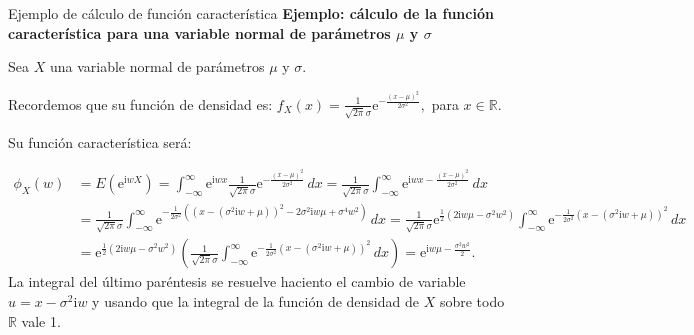 \documentclass[
  ignorenonframetext,
  aspectratio=169]{beamer}
\begin{document}
\begin{frame}{Ejemplo de cálculo de función característica}
\protect\hypertarget{ejemplo-de-cuxe1lculo-de-funciuxf3n-caracteruxedstica-2}{}
\textbf{Ejemplo: cálculo de la función característica para una variable
normal de parámetros \(\mu\) y \(\sigma\)}

Sea \(X\) una variable normal de parámetros \(\mu\) y \(\sigma\).

Recordemos que su función de densidad es:
\(f_X(x)=\frac{1}{\sqrt{2\pi}\sigma}\mathrm{e}^{-\frac{(x-\mu)^2}{2\sigma^2}},\)
para \(x\in \mathbb{R}\).

Su función característica será:

\[
\begin{array}{rl}
\phi_X (w) & =E\left(\mathrm{e}^{\mathrm{i}w X}\right)=\int_{-\infty}^\infty \mathrm{e}^{\mathrm{i}w x}\frac{1}{\sqrt{2\pi}\sigma}\mathrm{e}^{-\frac{(x-\mu)^2}{2\sigma^2}}\, dx = \frac{1}{\sqrt{2\pi}\sigma} \int_{-\infty}^\infty \mathrm{e}^{\mathrm{i}wx-\frac{(x-\mu)^2}{2\sigma^2}}\, dx \\  & =  \frac{1}{\sqrt{2\pi}\sigma} \int_{-\infty}^\infty \mathrm{e}^{-\frac{1}{2\sigma^2}\left((x-(\sigma^2 \mathrm{i}w+\mu))^2-2\sigma^2 \mathrm{i}w \mu+\sigma^4 w^2\right)}\, dx = \frac{1}{\sqrt{2\pi}\sigma} \mathrm{e}^{\frac{1}{2}(2 \mathrm{i}w \mu -\sigma^2 w^2)}\int_{-\infty}^\infty \mathrm{e}^{-\frac{1}{2\sigma^2}(x-(\sigma^2 \mathrm{i}w+\mu))^2}\, dx\\ &  = \mathrm{e}^{\frac{1}{2}(2 \mathrm{i}w \mu -\sigma^2 w^2)} \left( \frac{1}{\sqrt{2\pi}\sigma} \int_{-\infty}^\infty \mathrm{e}^{-\frac{1}{2\sigma^2}(x-(\sigma^2 \mathrm{i}w+\mu))^2}\, dx\right) =  \mathrm{e}^{ \mathrm{i}w \mu -\frac{\sigma^2 w^2}{2}}.
\end{array}
\] La integral del último paréntesis se resuelve haciento el cambio de
variable \(u=x-\sigma^2 \mathrm{i}w\) y usando que la integral de la
función de densidad de \(X\) sobre todo \(\mathbb{R}\) vale 1.
\end{frame}
\end{document}
